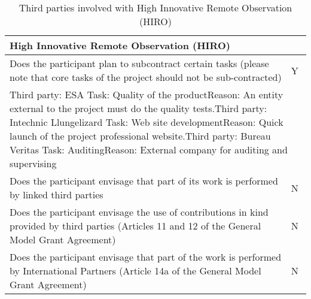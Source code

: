\begin{table}[H]
	\centering
	\begin{tabular}{|p{10cm}|p{4cm}|}
		\hline
		
		\multicolumn{2}{|p{14cm}|}{\textbf{High Innovative Remote Observation (HIRO)}}\\
		
		\hline
		
		Does the participant plan to subcontract certain tasks (please note that core tasks of the project should not be sub-contracted) & Y\\
		
		\hline
		
		\multicolumn{2}{|p{14cm}|}{Third party: ESA \newline Task: Quality of the product\newline Reason: An entity external to the project must do the quality tests.\vspace{0.2cm}\newline Third party: Intechnic Llungelizard \newline Task: Web site development\newline Reason: Quick launch of the project professional website.\vspace{0.2cm}\newline Third party: Bureau Veritas \newline Task: Auditing\newline Reason: External company for auditing and supervising}\\
		
		\hline
		
		Does the participant envisage that part of its work is performed by linked third parties & N\\
		
		\hline
		
		Does the participant envisage the use of contributions in kind provided by third parties (Articles 11 and 12 of the General Model Grant Agreement) & N\\
		
		\hline
		
		Does the participant envisage that part of the work is performed by International Partners (Article 14a of the General Model Grant Agreement) & N\\

		\hline
	\end{tabular}
	\caption{Third parties involved with High Innovative Remote Observation (HIRO)}
\end{table}



